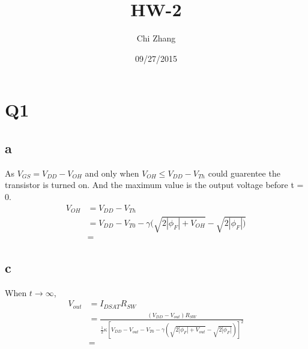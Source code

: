 \documentclass[a4paper,10pt]{article}
\title{HW-2}
\author{Chi Zhang}
\date{09/27/2015}
\begin{document}
\maketitle
\section*{Q1}
\subsection*{a}
As \begin{math}V_{GS} = V_{DD} - V_{OH}\end{math} and only when \begin{math}V_{OH} \leq V_{DD} - V_{Th}\end{math} could 
guarentee the transistor is turned on. And the maximum value is the output voltage before t = 0.
\begin{equation}
\begin{split}
 V_{OH} &= V_{DD} - V_{Th}\\
        &= V_{DD} - V_{T0} - \gamma(\sqrt{2|\phi_F| + V_{OH}} - \sqrt{2|\phi_F|)}\\
        &=
\end{split}
\end{equation}
\subsection*{c}
When \begin{math}t\rightarrow\infty\end{math},
\begin{equation}
\begin{split}
V_{out} &= I_{DSAT}R_{SW}\\
&= \frac{(V_{DD} - V_{out})R_{SW}}{\frac{1}{2}\kappa [V_{DD} - V_{out} - V_{T0} -\gamma(\sqrt{2|\phi_F| + V_{out}} - \sqrt{2|\phi_F|})] ^2}\\
&=
\end{split}
\end{equation}
\end{document}

